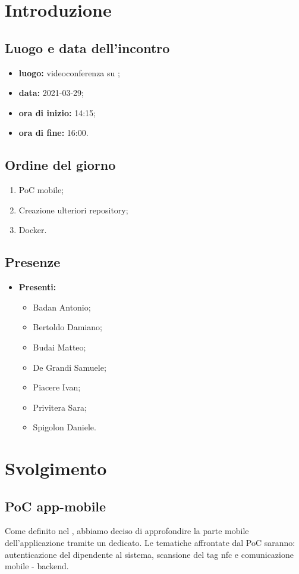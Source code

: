 \section*{Introduzione}
\subsection*{Luogo e data dell'incontro}
\begin{itemize}
	\item \textbf{luogo:} videoconferenza su ;
	\item \textbf{data:}  2021-03-29;
	\item \textbf{ora di inizio:} 14:15;
	\item \textbf{ora di fine:} 16:00.
\end{itemize}

\subsection*{Ordine del giorno}
\begin{enumerate}
	\item PoC mobile;
	\item Creazione ulteriori repository;
	\item Docker.
\end{enumerate}

\subsection*{Presenze}
\begin{itemize}
	\item \textbf{Presenti:}
	\begin{itemize}
		\item Badan Antonio;
		\item Bertoldo Damiano;
		\item Budai Matteo;
		\item De Grandi Samuele;
		\item Piacere Ivan;
		\item Privitera Sara;
		\item Spigolon Daniele.
	\end{itemize}
\end{itemize}

\section*{Svolgimento}
\subsection*{PoC app-mobile}
Come definito nel , abbiamo deciso di approfondire la parte mobile dell'applicazione tramite un  dedicato. Le tematiche affrontate dal PoC saranno: autenticazione del dipendente al sistema, scansione del tag nfc e comunicazione mobile - backend. 


